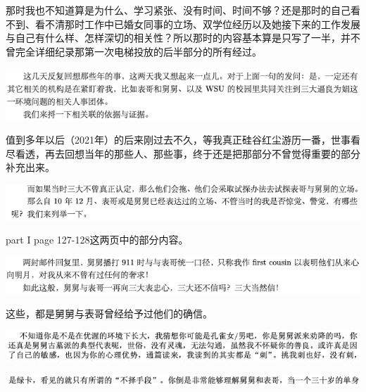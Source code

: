 \documentclass[9pt, b5paper]{article}
\begin{document}
那时我也不知道算是为什么、学习紧张、没有时间、时间不够？还是那时的自己看不到、看不清那时工作中已婚女同事的立场、双学位经历以及她接下来的工作发展与自己有什么样、怎样深切的相关性？所以那时的内容基本算是只写了一半，并不曾完全详细纪录那第一次电梯投放的后半部分的所有经过。

\begin{center}
\includegraphics[width=.9\linewidth]{./pic/backups_plans_20210424_094006.png}
\end{center}

值到多年以后（2021年）的后来刚过去不久，等我真正硅谷红尘游历一番，世事看尽看透，再去回想当年的那些人、那些事，终于还是把那部分不曾觉得重要的部分补充出来。

\begin{center}
\includegraphics[width=.9\linewidth]{./pic/backups_plans_20210424_102201.png}
\end{center}

part I page 127-128这两页中的部分内容。

\begin{center}
\includegraphics[width=.9\linewidth]{./pic/backups_plans_20210424_102322.png}
\end{center}

这些，都是舅舅与表哥曾经给予过他们的确信。

\begin{center}
\includegraphics[width=.9\linewidth]{./pic/backups_plans_20210424_102504.png}
\end{center}

\begin{center}
\includegraphics[width=.9\linewidth]{./pic/backups_plans_20210424_102530.png}
\end{center}
\end{document}

